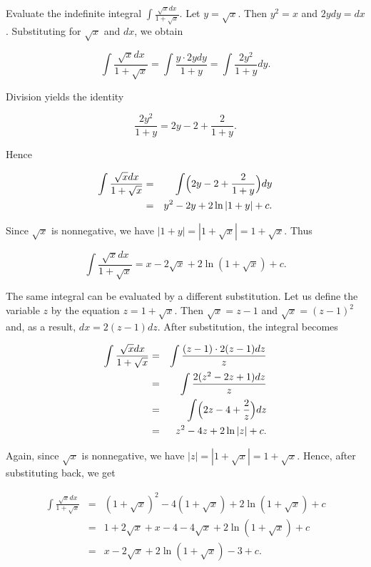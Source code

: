 \begin{example}
Evaluate the indefinite integral $\int \frac {\sqrt x dx}{1 + \sqrt x}$. 
Let $y = \sqrt x$. Then $y^2 = x$ and $2y dy = dx$. Substituting for $\sqrt x$ and $dx$, we obtain

$$
\int \frac {\sqrt x dx}{1 + \sqrt x} = \int \frac{y \cdot 2y dy}{1 + y} 
= \int \frac{2y^2}{1 + y} dy.
$$

\noindent Division yields the identity 

$$
\frac{2y^2}{1 + y} = 2y - 2 + \frac{2}{1 + y}. 
$$

\noindent Hence 

\begin{eqnarray*}
\int \frac{\sqrt x dx}{1 + \sqrt x} &=& \int \Bigl(2y - 2 + \frac{2}{1 + y} \Bigr) dy\\
                                                 &=& y^2 - 2y + 2 \ln| 1 + y| + c.
\end{eqnarray*}

\noindent Since $\sqrt x$ is nonnegative, we have $|1 + y| = |1 + \sqrt x| = 1 + \sqrt x$. Thus 

$$
\int \frac{\sqrt x dx}{1 + \sqrt x} = x - 2\sqrt x + 2 \ln (1 + \sqrt x ) + c.
$$

The same integral can be evaluated by a different substitution. Let us define the variable $z$ by the equation $z = 1 + \sqrt x$. Then $\sqrt x = z - 1$ and $\sqrt x= (z- 1)^2$ and, as a result, $dx = 2(z- 1)dz$. After substitution, the integral becomes

\begin{eqnarray*}
\int \frac {\sqrt x dx}{1 + \sqrt x} &=& \int \frac{(z - 1) \cdot 2(z - 1)dz}{z}\\
&=& \int \frac{2(z^2 - 2z + 1)dz}{z}\\
&=& \int \Bigl(2z - 4 + \frac{2}{z} \Bigr)dz\\
&=& z^2 - 4z + 2 \ln |z| + c.
\end{eqnarray*}

\noindent Again, since $\sqrt x$ is nonnegative, we have 
$|z| = |1 + \sqrt x| = 1 + \sqrt x$. Hence, after substituting back, we get


\begin{eqnarray*}
\int \frac {\sqrt x dx}{1 + \sqrt x} 
&=& (1 + \sqrt x)^2 - 4 (1 + \sqrt x) + 2 \ln (1 + \sqrt x) + c\\
&=& 1 + 2\sqrt x + x - 4  - 4 \sqrt x + 2 \ln (1 + \sqrt x) + c\\
&=& x - 2\sqrt x + 2 \ln(1 + \sqrt x) - 3 + c.
\end{eqnarray*}
\end{example}

